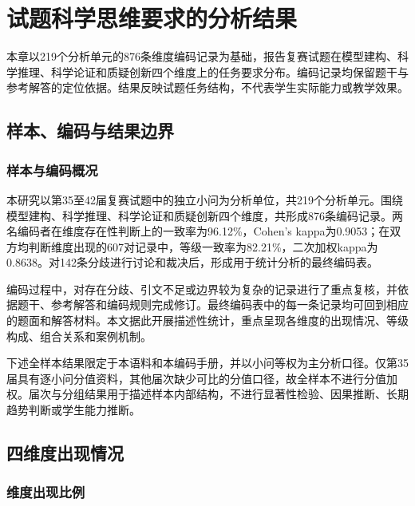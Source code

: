\documentclass[
  12pt,
  a4paper]{ctexbook}
\begin{document}
\chapter{试题科学思维要求的分析结果}\label{ux8bd5ux9898ux79d1ux5b66ux601dux7ef4ux8981ux6c42ux7684ux5206ux6790ux7ed3ux679c}

本章以219个分析单元的876条维度编码记录为基础，报告复赛试题在模型建构、科学推理、科学论证和质疑创新四个维度上的任务要求分布。编码记录均保留题干与参考解答的定位依据。结果反映试题任务结构，不代表学生实际能力或教学效果。

\section{样本、编码与结果边界}\label{ux6837ux672cux7f16ux7801ux4e0eux7ed3ux679cux8fb9ux754c}

\subsection{样本与编码概况}\label{ux6837ux672cux4e0eux7f16ux7801ux6982ux51b5}

本研究以第35至42届复赛试题中的独立小问为分析单位，共219个分析单元。围绕模型建构、科学推理、科学论证和质疑创新四个维度，共形成876条编码记录。两名编码者在维度存在性判断上的一致率为96.12\%，Cohen's
kappa为0.9053；在双方均判断维度出现的607对记录中，等级一致率为82.21\%，二次加权kappa为0.8638。对142条分歧进行讨论和裁决后，形成用于统计分析的最终编码表。

编码过程中，对存在分歧、引文不足或边界较为复杂的记录进行了重点复核，并依据题干、参考解答和编码规则完成修订。最终编码表中的每一条记录均可回到相应的题面和解答材料。本文据此开展描述性统计，重点呈现各维度的出现情况、等级构成、组合关系和案例机制。

下述全样本结果限定于本语料和本编码手册，并以小问等权为主分析口径。仅第35届具有逐小问分值资料，其他届次缺少可比的分值口径，故全样本不进行分值加权。届次与分组结果用于描述样本内部结构，不进行显著性检验、因果推断、长期趋势判断或学生能力推断。

\section{四维度出现情况}\label{ux56dbux7ef4ux5ea6ux51faux73b0ux60c5ux51b5}

\subsection{维度出现比例}\label{ux7ef4ux5ea6ux51faux73b0ux6bd4ux4f8b}
\end{document}
